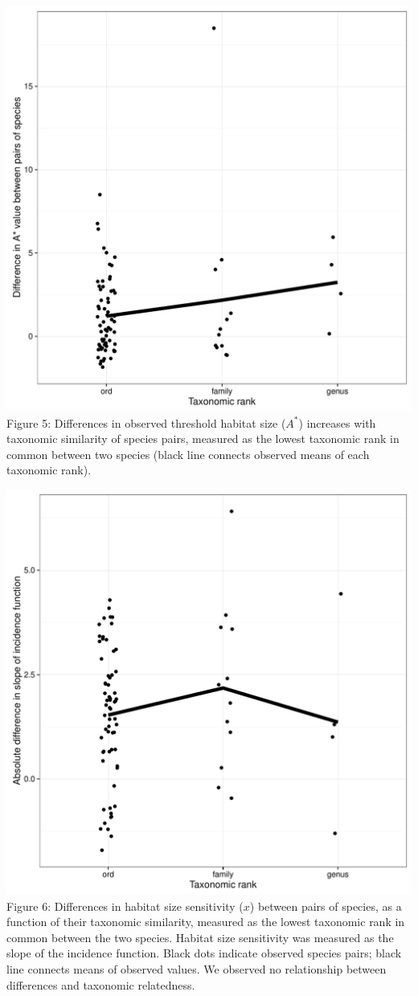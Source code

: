 \includegraphics[width=5.5in]{figures/astar.pdf} Figure 5: Differences in observed
threshold habitat size (\(A^{*}\)) increases with taxonomic similarity
of species pairs, measured as the lowest taxonomic rank in common
between two species (black line connects observed means of each
taxonomic rank).

\includegraphics[width=5.5in]{figures/xbar.pdf} Figure 6: Differences in habitat
size sensitivity (\(x\)) between pairs of species, as a function of
their taxonomic similarity, measured as the lowest taxonomic rank in
common between the two species. Habitat size sensitivity was measured as
the slope of the incidence function. Black dots indicate observed
species pairs; black line connects means of observed values. We observed
no relationship between differences and taxonomic relatedness.

